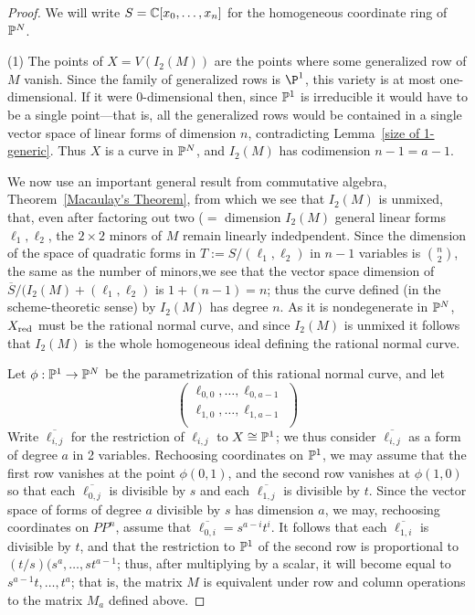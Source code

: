 \begin{proof} 
We will write $S = {\mathbb C}[x_{0},\dots,x_{n}]$ for the homogeneous coordinate ring of
${\mathbb P}^{N}$.

(1) The points of  $X = V(I_{2}(M))$ are the points where some generalized
row of $M$ vanish. Since the family of generalized rows is $\P^{1}$, this variety is
at most one-dimensional. If it were 0-dimensional then, since ${\mathbb P}^{1}$ is irreducible
it would have to be a single point---that is, all the generalized rows would be contained
in a single vector space of linear forms of dimension $n$, contradicting Lemma~\ref{size of 1-generic}.
Thus $X$ is a curve in ${\mathbb P}^{N}$, and $I_{2}(M)$ has codimension $n-1 = a-1$.

We now use an important general result from commutative algebra, Theorem~\ref{Macaulay's Theorem}, from which we see that $I_{2}(M)$ is unmixed, that, even after factoring out two ($=$ dimension $I_{2}(M)$ general linear forms $\ell_{1}, \ell_{2}$, the $2\times 2$ minors of $M$ remain linearly indedpendent.   Since the dimension of the space of quadratic forms in 
$T := S/(\ell_{1}, \ell_{2})$ in $n-1$ variables is ${n\choose 2}$,  the same as the number of minors,we see that the vector space dimension of $\overline S/(I_{2}(M)+(\ell_{1}, \ell_{2})$
is $1+(n-1) = n$; thus the curve defined (in the scheme-theoretic sense) by $I_{2}(M)$ 
has degree $n$. As it is nondegenerate in ${\mathbb P}^{N}$, $X_{\rm red}$ must be the rational normal curve, and since $I_{2}(M)$ is unmixed it follows that $I_{2}(M)$ is the whole homogeneous ideal
defining the rational normal curve.

Let $\phi: {\mathbb P}^{1}\to {\mathbb P}^{N}$ be the parametrization of this rational normal curve, and let
$$
\begin{pmatrix}
 \ell_{0,0},\dots, \ell_{0,a-1}\\
  \ell_{1,0},\dots, \ell_{1,a-1}\\
\end{pmatrix}
$$
 Write $\overline{\ell_{i,j}}$ for the restriction of $\ell_{i,j}$ to $X \cong {\mathbb P}^{1}$; we thus consider
  $\overline{\ell_{i,j}}$ as a form of degree $a$ in 2 variables. 
 Rechoosing coordinates on ${\mathbb P}^{1}$, we may assume that the first row vanishes at the point $\phi(0,1)$, and the second row vanishes at $\phi(1,0)$ so that each $\overline{\ell_{0,j}}$ is divisible by $s$ and each $\overline{\ell_{1,j}}$ is divisible by $t$. Since the vector space of forms of degree $a$ divisible by $s$ has dimension $a$, we may, rechoosing coordinates on $PP^{n}$, assume that $\overline{\ell_{0,i}} = s^{a-i}t^{i}$. It follows that
each $\overline{\ell_{1,i}}$ is divisible by $t$, and that the restriction to ${\mathbb P}^{1}$ of the second
row is proportional to $(t/s)(s^{a},\dots,st^{a-1}$; thus, after multiplying by a scalar, it will become
equal to $s^{a-1}t,\dots,t^{a}$; that is, the matrix $M$ is equivalent under row and column operations to the matrix $M_{a}$ defined above.


\end{proof}
